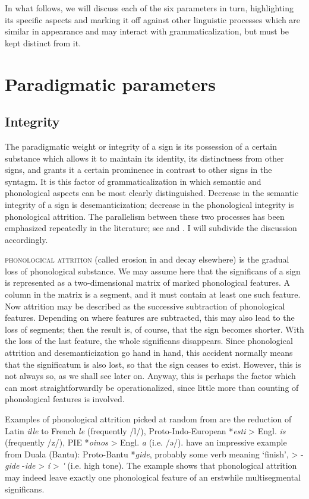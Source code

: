 In what follows, we will discuss each of the six parameters in turn, highlighting its specific aspects and marking it off against other linguistic processes which are similar in appearance and may interact with grammaticalization, but must be kept distinct from it.

\section{Paradigmatic parameters}
\subsection{Integrity} \label{sec:4.2.1}

The paradigmatic weight or integrity of a sign is its possession of a certain substance which allows it to maintain its identity, its distinctness from other signs, and grants it a certain prominence in contrast to other signs in the syntagm. It is this factor of grammaticalization in which semantic and phonological aspects can be most clearly distinguished. Decrease in the semantic integrity of a sign is desemanticization; decrease in the phonological integrity is phonological attrition. The parallelism between these two processes has been emphasized repeatedly in the literature; see \citet[135--139]{Meillet1912} and \citet[114--119]{Lehmann1974}. I will subdivide the discussion accordingly.

\textsc{phonological attrition} (called erosion in \citealt[21ff]{HeineEtAl1984} and decay elsewhere) is the gradual loss of phonological substance. We may assume here that the significans of a sign is represented as a two-dimensional matrix of marked phonological features. A column in the matrix is a segment, and it must contain at least one such feature. Now attrition may be described as the successive subtraction of phonological features. Depending on where features are subtracted, this may also lead to the loss of segments; then the result is, of course, that the sign becomes shorter. With the loss of the last feature, the whole significans disappears. Since phonological attrition and desemanticization go hand in hand, this accident normally means that the significatum is also lost, so that the sign ceases to exist. However, this is not always so, as we shall see later on. Anyway, this is perhaps the factor which can most straightforwardly be operationalized, since little more than counting of phonological features is involved.

Examples of phonological attrition picked at random from  are the reduction of Latin \textit{ille} to French \textit{le} (frequently /l/), Proto-Indo-European *\textit{esti} {\textgreater} Engl. \textit{is} (frequently /z/), PIE *\textit{oinos} {\textgreater} Engl. \textit{a} (i.e. /ə/). \citet[25]{HeineEtAl1984} have an impressive example from Duala (Bantu): Proto-Bantu *\textit{gide}, probably some verb meaning ‘finish’, {\textgreater} -\textit{gide} \glcompl {\textgreater} -\textit{ide} {\textgreater} \textit{í} {\textgreater} \textit{\'{ }} (i.e. high tone). The example shows that phonological attrition may indeed leave exactly one phonological feature of an erstwhile multisegmental significans.

